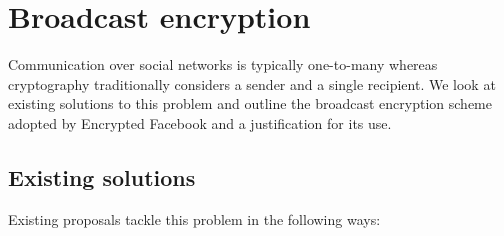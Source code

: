 





\FloatBarrier
\section{Broadcast encryption}

Communication over social networks is typically one-to-many whereas cryptography traditionally considers a sender and a single recipient. We look at existing solutions to this problem and outline the broadcast encryption scheme adopted by Encrypted Facebook and a justification for its use.


\FloatBarrier
\subsection{Existing solutions}

Existing proposals tackle this problem in the following ways:

